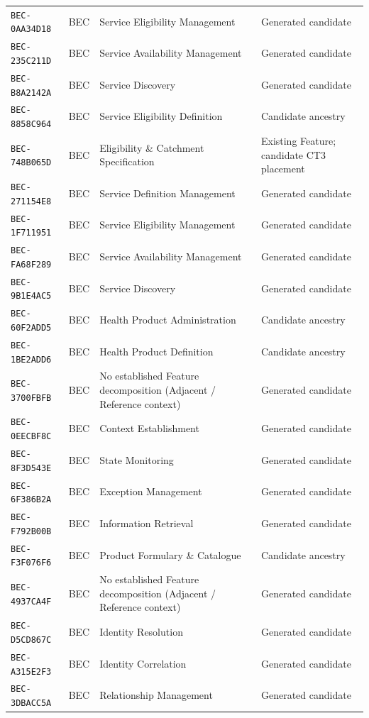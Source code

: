 \documentclass[11pt,a4paper,openany]{book}
\begin{document}
\begin{longtable}{@{}p{.19\linewidth}p{.12\linewidth}p{.39\linewidth}p{.24\linewidth}@{}}
\texttt{BEC-0AA34D18} & BEC & Service Eligibility Management & Generated candidate \\
\texttt{BEC-235C211D} & BEC & Service Availability Management & Generated candidate \\
\texttt{BEC-B8A2142A} & BEC & Service Discovery & Generated candidate \\
\texttt{BEC-8858C964} & BEC & Service Eligibility Definition & Candidate ancestry \\
\texttt{BEC-748B065D} & BEC & Eligibility \& Catchment Specification & Existing Feature; candidate CT3 placement \\
\texttt{BEC-271154E8} & BEC & Service Definition Management & Generated candidate \\
\texttt{BEC-1F711951} & BEC & Service Eligibility Management & Generated candidate \\
\texttt{BEC-FA68F289} & BEC & Service Availability Management & Generated candidate \\
\texttt{BEC-9B1E4AC5} & BEC & Service Discovery & Generated candidate \\
\texttt{BEC-60F2ADD5} & BEC & Health Product Administration & Candidate ancestry \\
\texttt{BEC-1BE2ADD6} & BEC & Health Product Definition & Candidate ancestry \\
\texttt{BEC-3700FBFB} & BEC & No established Feature decomposition (Adjacent / Reference context) & Generated candidate \\
\texttt{BEC-0EECBF8C} & BEC & Context Establishment & Generated candidate \\
\texttt{BEC-8F3D543E} & BEC & State Monitoring & Generated candidate \\
\texttt{BEC-6F386B2A} & BEC & Exception Management & Generated candidate \\
\texttt{BEC-F792B00B} & BEC & Information Retrieval & Generated candidate \\
\texttt{BEC-F3F076F6} & BEC & Product Formulary \& Catalogue & Candidate ancestry \\
\texttt{BEC-4937CA4F} & BEC & No established Feature decomposition (Adjacent / Reference context) & Generated candidate \\
\texttt{BEC-D5CD867C} & BEC & Identity Resolution & Generated candidate \\
\texttt{BEC-A315E2F3} & BEC & Identity Correlation & Generated candidate \\
\texttt{BEC-3DBACC5A} & BEC & Relationship Management & Generated candidate \\

\end{longtable}
\end{document}
